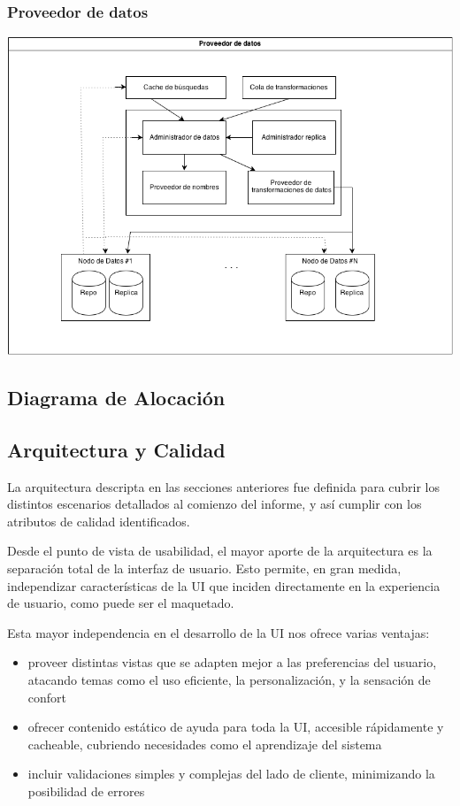 \subsubsection*{Proveedor de datos}

\includegraphics[scale=0.5]{backend}


\subsection*{Diagrama de Alocaci\'on}




\subsection*{Arquitectura y Calidad}

La arquitectura descripta en las secciones anteriores fue definida para cubrir los distintos escenarios detallados al comienzo del informe, y as\'i cumplir con los atributos de calidad identificados.

Desde el punto de vista de usabilidad, el mayor aporte de la arquitectura es la separaci\'on total de la interfaz de usuario. Esto permite, en gran medida, independizar caracter\'isticas de la UI que inciden directamente en la experiencia de usuario, como puede ser el maquetado.

Esta mayor independencia en el desarrollo de la UI nos ofrece varias ventajas:

\begin{itemize}
\item proveer distintas vistas que se adapten mejor a las preferencias del usuario, atacando temas como el uso eficiente, la personalizaci\'on, y la sensaci\'on de confort
\item ofrecer contenido est\'atico de ayuda para toda la UI, accesible r\'apidamente y cacheable, cubriendo necesidades como el aprendizaje del sistema
\item incluir validaciones simples y complejas del lado de cliente, minimizando la posibilidad de errores
\end{itemize}

